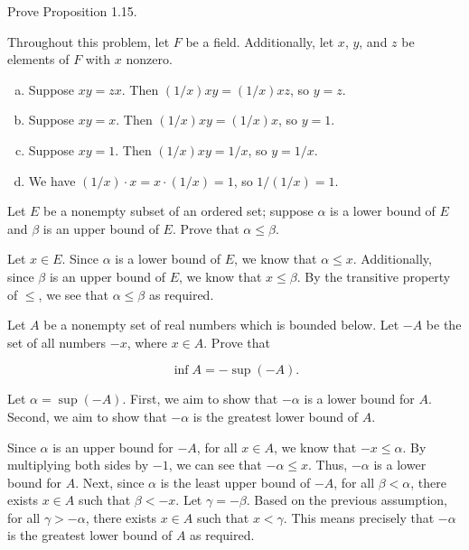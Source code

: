 \documentclass{zupan}
\begin{document}
\begin{exercise}{3}
  Prove Proposition 1.15.
\end{exercise}

\begin{solution}
  Throughout this problem, let $F$ be a field. Additionally, let $x$, $y$, and
  $z$ be elements of $F$ with $x$ nonzero.

  \begin{enumerate}[(a), noitemsep]
    \item Suppose $xy = zx$. Then $(1/x)xy = (1/x)xz$, so $y = z$.
    \item Suppose $xy = x$. Then $(1/x)xy = (1/x)x$, so $y = 1$.
    \item Suppose $xy = 1$. Then $(1/x)xy = 1/x$, so $y = 1/x$.
    \item We have $(1/x) \cdot x = x \cdot (1/x) = 1$, so $1/(1/x) = 1$.
  \end{enumerate}
\end{solution}

\begin{exercise}{4}
  Let $E$ be a nonempty subset of an ordered set; suppose $\alpha$ is a lower
  bound of $E$ and $\beta$ is an upper bound of $E$. Prove that $\alpha \leq
  \beta$.
\end{exercise}

\begin{solution}
  Let $x \in E$. Since $\alpha$ is a lower bound of $E$, we know that $\alpha
  \leq x$. Additionally, since $\beta$ is an upper bound of $E$, we know that
  $x \leq \beta$. By the transitive property of $\leq$, we see that $\alpha
  \leq \beta$ as required.
\end{solution}

\begin{exercise}{5}
  Let $A$ be a nonempty set of real numbers which is bounded below. Let $-A$ be
  the set of all numbers $-x$, where $x \in A$. Prove that

  \[\inf{A} = -\sup(-A).\]
\end{exercise}

\begin{solution}
  Let $\alpha = \sup(-A)$. First, we aim to show that $-\alpha$ is a lower
  bound for $A$. Second, we aim to show that $-\alpha$ is the greatest lower
  bound of $A$.

  Since $\alpha$ is an upper bound for $-A$, for all $x \in A$, we know that
  $-x \leq \alpha$. By multiplying both sides by $-1$, we can see that $-\alpha
  \leq x$. Thus, $-\alpha$ is a lower bound for $A$. Next, since $\alpha$ is
  the least upper bound of $-A$, for all $\beta < \alpha$, there exists $x \in
  A$ such that $\beta < -x$. Let $\gamma = -\beta$. Based on the previous
  assumption, for all $\gamma > -\alpha$, there exists $x \in A$ such that $x <
  \gamma$. This means precisely that $-\alpha$ is the greatest lower bound of
  $A$ as required.
\end{solution}
\end{document}
